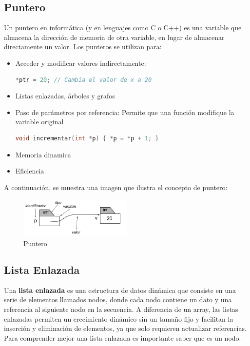     \subsection{Puntero}
    Un puntero en informática (y en lenguajes como C o C++) es una variable que almacena la dirección de memoria de otra variable, en lugar de almacenar directamente un valor.
    Los punteros se utilizan para:
    \begin{itemize}
        \item Acceder y modificar valores indirectamente:
            \begin{lstlisting}[style=CodeStyle, language=C, caption={Acceder y modificar valores indirectamente}, label={lst:codigo}]
            *ptr = 20; // Cambia el valor de x a 20
            \end{lstlisting}
        \item Listas enlazadas, árboles y grafos
        \item Paso de parámetros por referencia: Permite que una función modifique la variable original
            \begin{lstlisting}[style=CodeStyle, language=C, caption={Paso de parámetros por referencia}, label={lst:codigo}]
                void incrementar(int *p) { *p = *p + 1; }
            \end{lstlisting}
        \item Memoria dinamica
        \item Eficiencia
    \end{itemize}
    A continuación, se muestra una imagen que ilustra el concepto de puntero:
    \begin{figure}[H]
        \centering %
        \includegraphics[width=0.5\textwidth]{./src/images/puntero.png} 
        \caption{Puntero} 
        \label{fig: puntero} 
    \end{figure}

    \subsection{Lista Enlazada}
    Una \textbf{lista enlazada} es una estructura de datos dinámica que consiste en una serie de elementos llamados nodos, donde cada nodo contiene un dato y una referencia 
    al siguiente nodo en la secuencia. A diferencia de un array, las listas enlazadas permiten un crecimiento dinámico sin un tamaño fijo y facilitan la inserción 
    y eliminación de elementos, ya que solo requieren actualizar referencias.\\
    Para comprender mejor una lista enlazada es importante saber que es un nodo.
